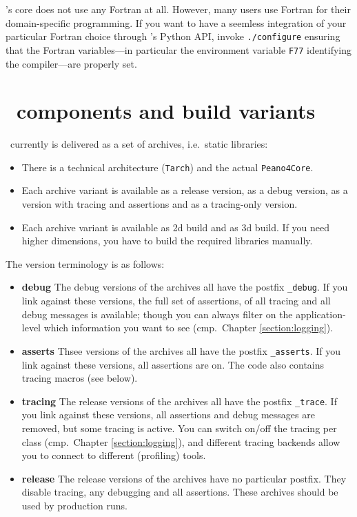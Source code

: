 \Peano's core does not use any Fortran at all. 
However, many users use Fortran for their domain-specific programming.
If you want to have a seemless integration of your particular Fortran choice
through \Peano's Python API, invoke \texttt{./configure} ensuring that the
Fortran variables---in particular the environment variable \texttt{F77}
identifying the compiler---are properly set.



\section{\Peano\ components and build variants}
\label{chapter:installation:build-variants}

\Peano\ currently is delivered as a set of archives, i.e.~static libraries:
\begin{itemize}
  \item There is a technical architecture (\texttt{Tarch}) and the actual
  \texttt{Peano4Core}.
  \item Each archive variant is available as a release version, as a debug
  version, as a version with tracing and assertions and as a tracing-only
  version.
  \item Each archive variant is available as 2d build and as 3d build. If you
  need higher dimensions, you have to build the required libraries manually.
\end{itemize}


The version terminology is as follows:
\begin{itemize}
  \item {\bf debug} The debug versions of the archives all have the postfix
  \texttt{\_debug}. If you link against these versions, the full set of
  assertions, of all tracing and all debug messages is available; though you can
  always filter on the application-level which information you want to see
  (cmp.~Chapter \ref{section:logging}).
  \item {\bf asserts} Thsee versions of the archives all have the postfix
  \texttt{\_asserts}. If you link against these versions, all assertions are on.
  The code also contains tracing macros (see below).
  \item {\bf tracing} The release versions of the archives all have the postfix
  \texttt{\_trace}. If you link against these versions, all assertions and debug
  messages are removed, but some tracing is active. You can switch on/off the
  tracing per class (cmp.~Chapter \ref{section:logging}), and different tracing
  backends allow you to connect to different (profiling) tools.
  \item {\bf release} The release versions of the archives have no
  particular postfix. They disable tracing, any debugging and all assertions.
  These archives should be used by production runs.
\end{itemize}


